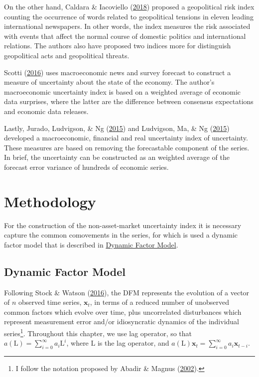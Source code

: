\documentclass[12pt,twoside]{reedthesis}
\begin{document}
On the other hand, Caldara \& Iacoviello (\protect\hyperlink{ref-caldiaco:2018}{2018}) proposed a geopolitical risk index counting the occurrence of words related to geopolitical tensions in eleven leading international newspapers. In other words, the index measures the risk associated with events that affect the normal course of domestic politics and international relations. The authors also have proposed two indices more for distinguish geopolitical acts and geopolitical threats.

Scotti (\protect\hyperlink{ref-scotti:2016}{2016}) uses macroeconomic news and survey forecast to construct a measure of uncertainty about the state of the economy. The author's macroeconomic uncertainty index is based on a weighted average of economic data surprises, where the latter are the difference between consensus expectations and economic data releases.

Lastly, Jurado, Ludvigson, \& Ng (\protect\hyperlink{ref-juraetal:2015}{2015}) and Ludvigson, Ma, \& Ng (\protect\hyperlink{ref-ludvetal:2015}{2015}) developed a macroeconomic, financial and real uncertainty index of uncertainty. These measures are based on removing the forecastable component of the series. In brief, the uncertainty can be constructed as an weighted average of the forecast error variance of hundreds of economic series.

\hypertarget{methodology}{%
\chapter{Methodology}\label{methodology}}

For the construction of the non-asset-market uncertainty index it is necessary capture the common comovements in the series, for which is used a dynamic factor model that is described in \protect\hyperlink{dynamic-factor-model}{Dynamic Factor Model}.

\hypertarget{dynamic-factor-model}{%
\section{Dynamic Factor Model}\label{dynamic-factor-model}}

Following Stock \& Watson (\protect\hyperlink{ref-stocwats:2016}{2016}), the DFM represents the evolution of a vector of \(n\) observed time series, \(\bm x_{t}\), in terms of a reduced number of unobserved common factors which evolve over time, plus uncorrelated disturbances which represent measurement error and/or idiosyncratic dynamics of the individual series\footnote{I follow the notation proposed by Abadir \& Magnus (\protect\hyperlink{ref-abadmagn:2002}{2002}).}. Throughout this chapter, we use lag operator, so that \(a(\ensuremath{\mathrm{L}}) = \sum_{i = 0}^{\infty} a_{i}\ensuremath{\mathrm{L}}^{i}\), where \(\ensuremath{\mathrm{L}}\) is the lag operator, and \(a(\ensuremath{\mathrm{L}})\bm x_{t} = \sum_{i = 0}^{\infty} a_{i}\bm x_{t - i}\).
\end{document}
